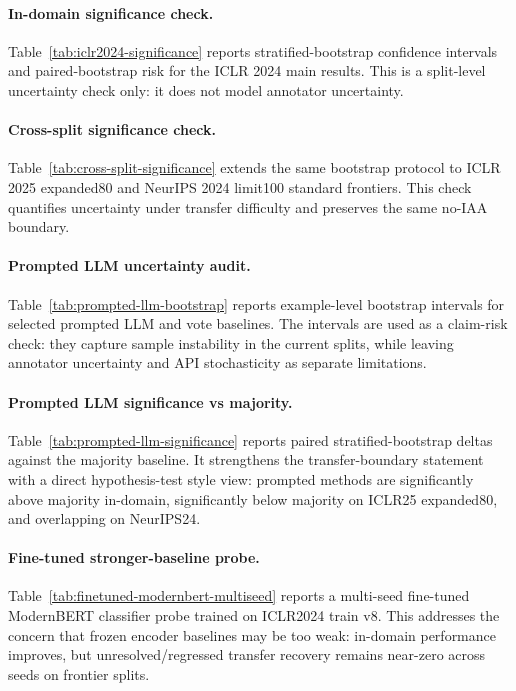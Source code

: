 \paragraph{In-domain significance check.}
Table~\ref{tab:iclr2024-significance} reports stratified-bootstrap confidence intervals and paired-bootstrap risk for the ICLR 2024 main results.
This is a split-level uncertainty check only: it does not model annotator uncertainty.


\paragraph{Cross-split significance check.}
Table~\ref{tab:cross-split-significance} extends the same bootstrap protocol to ICLR 2025 expanded80 and NeurIPS 2024 limit100 standard frontiers.
This check quantifies uncertainty under transfer difficulty and preserves the same no-IAA boundary.


\paragraph{Prompted LLM uncertainty audit.}
Table~\ref{tab:prompted-llm-bootstrap} reports example-level bootstrap intervals for selected prompted LLM and vote baselines.
The intervals are used as a claim-risk check: they capture sample instability in the current splits, while leaving annotator uncertainty and API stochasticity as separate limitations.


\paragraph{Prompted LLM significance vs majority.}
Table~\ref{tab:prompted-llm-significance} reports paired stratified-bootstrap deltas against the majority baseline.
It strengthens the transfer-boundary statement with a direct hypothesis-test style view: prompted methods are significantly above majority in-domain, significantly below majority on ICLR25 expanded80, and overlapping on NeurIPS24.


\paragraph{Fine-tuned stronger-baseline probe.}
Table~\ref{tab:finetuned-modernbert-multiseed} reports a multi-seed fine-tuned ModernBERT classifier probe trained on ICLR2024 train v8.
This addresses the concern that frozen encoder baselines may be too weak: in-domain performance improves, but unresolved/regressed transfer recovery remains near-zero across seeds on frontier splits.


